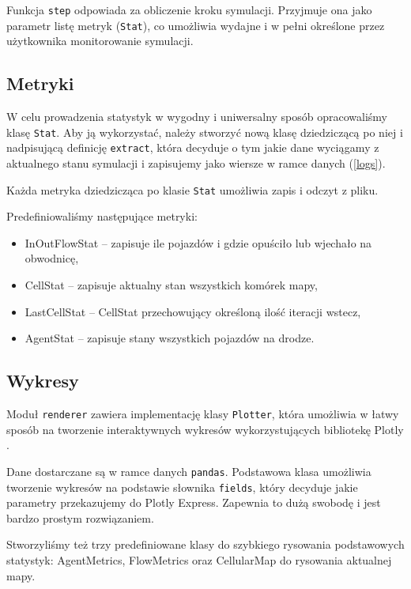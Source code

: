 \documentclass[a4paper,12pt]{article}
\begin{document}
	Funkcja \texttt{step} odpowiada za obliczenie kroku symulacji. Przyjmuje ona jako parametr listę metryk (\texttt{Stat}), co umożliwia wydajne i w pełni określone przez użytkownika monitorowanie symulacji.

    \subsection{Metryki}
    W celu prowadzenia statystyk w wygodny i uniwersalny sposób opracowaliśmy klasę \texttt{Stat}.
    Aby ją wykorzystać, należy stworzyć nową klasę dziedziczącą po niej i nadpisującą definicję \texttt{extract}, która decyduje o tym jakie dane wyciągamy z aktualnego stanu symulacji i zapisujemy jako wiersze w ramce danych (\ref{logs}).
    
    Każda metryka dziedzicząca po klasie \texttt{Stat} umożliwia zapis i odczyt z pliku.
    
    Predefiniowaliśmy następujące metryki:
    \begin{itemize}
    	\item InOutFlowStat -- zapisuje ile pojazdów i gdzie opuściło lub wjechało na obwodnicę,
    	\item CellStat -- zapisuje aktualny stan wszystkich komórek mapy,
    	\item LastCellStat -- CellStat przechowujący określoną ilość iteracji wstecz,
    	\item AgentStat -- zapisuje stany wszystkich pojazdów na drodze.
    \end{itemize}
    
    \subsection{Wykresy}
    Moduł \texttt{renderer} zawiera implementację klasy \texttt{Plotter}, która umożliwia w łatwy sposób na tworzenie interaktywnych wykresów wykorzystujących bibliotekę Plotly \cite{plotly}.
    
    Dane dostarczane są w ramce danych \texttt{pandas}.
    Podstawowa klasa umożliwia tworzenie wykresów na podstawie słownika \texttt{fields}, który decyduje jakie parametry przekazujemy do Plotly Express.
    Zapewnia to dużą swobodę i jest bardzo prostym rozwiązaniem.
    
    Stworzyliśmy też trzy predefiniowane klasy do szybkiego rysowania podstawowych statystyk: AgentMetrics, FlowMetrics oraz CellularMap do rysowania aktualnej mapy.
    
\end{document}
